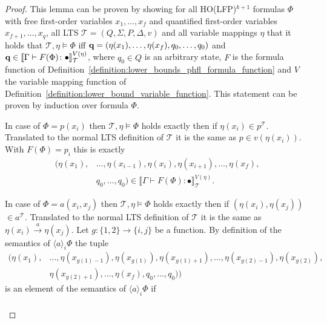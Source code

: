 \begin{proof}
    This lemma can be proven by showing for all HO(LFP)$^{k+1}$ formulas $\Phi$ with free first-order variables $x_1,
    \dots, x_f$ and quantified first-order variables $x_{f+1}, \dots, x_q$, all LTS $\mathcal{T} = (Q, \Sigma, P,
    \Delta, v)$ and all variable mappings $\eta$ that it holds that $\mathcal{T}, \eta \models \Phi$ iff $\emph{q} =
    (\eta(x_1), \dots, \eta(x_f), q_0, \dots, q_0)$ and $\emph{q} \in \llbracket
    \Gamma \vdash F(\Phi)\colon \bullet \rrbracket^{V(\eta)}_{\mathcal{T}}$, where $q_0
    \in Q$ is an arbitrary state, $F$ is the formula function of
    Definition~\ref{definition:lower_bounds_phfl_formula_function} and $V$ the variable mapping function of
    Definition~\ref{definition:lower_bound_variable_function}. This statement can be proven by induction over formula
    $\Phi$.
    \begin{compactitem}
        \item In case of $\Phi = p(x_i)$ then $\mathcal{T}, \eta \models \Phi$ holds exactly then if $\eta(x_i) \in
        p^\mathcal{T}$. Translated to the normal LTS definition of $\mathcal{T}$ it is the same as $p \in v(\eta(x_i))$.
        With $F(\Phi) = p_i$ this is exactly
        \begin{align*}
            (\eta(x_1),& \dots, \eta(x_{i-1}), \eta(x_{i}), \eta(x_{i+1}), \dots, \eta(x_f),\\& q_0, \dots, q_0) \in
            \llbracket \Gamma \vdash F(\Phi) \colon \bullet \rrbracket^{V(\eta)}_\mathcal{T}.
        \end{align*}
        \item In case of $\Phi = a(x_i, x_j)$ then $\mathcal{T}, \eta \models \Phi$ holds exactly then if $(\eta(x_i)
        , \eta(x_j))$ $ \in a^\mathcal{T}$. Translated to the normal LTS definition of $\mathcal{T}$ it is the same as $
        \eta(x_i) \overset{a}{\rightarrow} \eta(x_j)$. Let $g: \{1, 2\} \rightarrow \{i, j\}$ be a function.
        By  definition of the semantics of $\langle a \rangle_i \Phi$ the tuple
        \begin{align*}
            (\eta(x_1),& \dots, \eta(x_{g(1) - 1}), \eta(x_{g(1)}), \eta(x_{g(1)+1}), \dots, \eta(x_{g(2)-1}), \eta
            (x_{g(2)}),\\& \eta(x_{g(2)+1}), \dots, \eta(x_f), q_0, \dots, q_0))
        \end{align*}
        is an element of the semantics of $\langle a \rangle_i \Phi$ if
        \begin{align*}

\end{align*}
\end{compactitem}
\end{proof}
